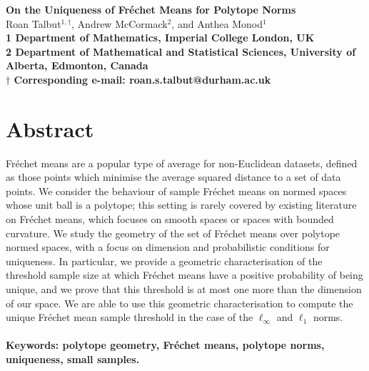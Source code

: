 \documentclass[10pt]{article}
\theoremstyle{definition}
\theoremstyle{remark}
\begin{document}
	
	\def\spacingset#1{\renewcommand{\baselinestretch}%
		{#1}\small\normalsize} \spacingset{1}
	
	
	\begin{flushleft}
		{\Large{\textbf{On the Uniqueness of Fr\'echet Means for Polytope Norms}}}
		\newline
		\\
		Roan Talbut$^{1,\dagger}$, Andrew McCormack$^{2}$, and Anthea Monod$^{1}$
		\\
		\bigskip
		\bf{1} Department of Mathematics, Imperial College London, UK
		\\
		\bf{2} Department of Mathematical and Statistical Sciences, University of Alberta, Edmonton, Canada
		\\
		\bigskip
		$\dagger$ Corresponding e-mail: roan.s.talbut@durham.ac.uk
	\end{flushleft}
	
	
	\section*{Abstract}
	
	Fr\'echet means are a popular type of average for non-Euclidean datasets, defined as those points which minimise the average squared distance to a set of data points. We consider the behaviour of sample Fr\'echet means on normed spaces whose unit ball is a polytope; this setting is rarely covered by existing literature on Fr\'echet means, which focuses on smooth spaces or spaces with bounded curvature. We study the geometry of the set of Fr\'echet means over polytope normed spaces, with a focus on dimension and probabilistic conditions for uniqueness. In particular, we provide a geometric characterisation of the threshold sample size at which Fr\'echet means have a positive probability of being unique, and we prove that this threshold is at most one more than the dimension of our space. We are able to use this geometric characterisation to compute the unique Fr\'echet mean sample threshold in the case of the $\ell_\infty$ and $\ell_1$ norms.
	
	
	\paragraph{Keywords: polytope geometry, Fr\'echet means, polytope norms, uniqueness, small samples.}
	
\end{document}
